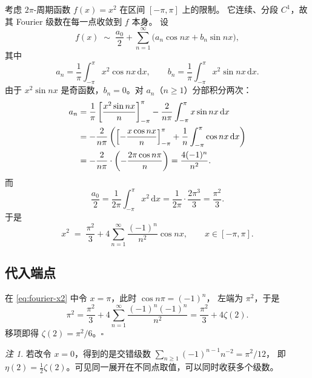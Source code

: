 \documentclass[11pt,a4paper]{ctexart}
\theoremstyle{definition}
\theoremstyle{remark}
\newtheorem*{remark}{注}
\newcommand{\dd}{\,\mathrm{d}}
\begin{document}
考虑 $2\pi$-周期函数 $f(x)=x^{2}$ 在区间 $[-\pi,\pi]$ 上的限制。
它连续、分段 $C^{1}$，故其 Fourier 级数在每一点收敛到 $f$ 本身。
设
\begin{equation}
  f(x) \;\sim\; \frac{a_{0}}{2}+\sum_{n=1}^{\infty}
  \bigl(a_{n}\cos nx + b_{n}\sin nx\bigr),
\end{equation}
其中
\begin{equation}
  a_{n}=\frac{1}{\pi}\int_{-\pi}^{\pi} x^{2}\cos nx\dd x,
  \qquad
  b_{n}=\frac{1}{\pi}\int_{-\pi}^{\pi} x^{2}\sin nx\dd x .
\end{equation}
由于 $x^{2}\sin nx$ 是奇函数，$b_{n}=0$。对 $a_{n}$（$n\ge 1$）分部积分两次：
\begin{align}
  a_{n}
  &=\frac{1}{\pi}\left[\frac{x^{2}\sin nx}{n}\right]_{-\pi}^{\pi}
    -\frac{2}{n\pi}\int_{-\pi}^{\pi} x\sin nx\dd x \notag\\
  &=-\frac{2}{n\pi}\left(\left[-\frac{x\cos nx}{n}\right]_{-\pi}^{\pi}
    +\frac{1}{n}\int_{-\pi}^{\pi}\cos nx\dd x\right) \notag\\
  &=-\frac{2}{n\pi}\cdot\left(-\frac{2\pi\cos n\pi}{n}\right)
    =\frac{4(-1)^{n}}{n^{2}} .
  \label{eq:an}
\end{align}
而
\begin{equation}
  \frac{a_{0}}{2}=\frac{1}{2\pi}\int_{-\pi}^{\pi}x^{2}\dd x
  =\frac{1}{2\pi}\cdot\frac{2\pi^{3}}{3}=\frac{\pi^{2}}{3}.
\end{equation}
于是
\begin{equation}
  x^{2} \;=\; \frac{\pi^{2}}{3}+4\sum_{n=1}^{\infty}
  \frac{(-1)^{n}}{n^{2}}\cos nx,
  \qquad x\in[-\pi,\pi].
  \label{eq:fourier-x2}
\end{equation}

\subsection{代入端点}

在 \eqref{eq:fourier-x2} 中令 $x=\pi$，此时 $\cos n\pi=(-1)^{n}$，
左端为 $\pi^{2}$，于是
\begin{equation}
  \pi^{2}=\frac{\pi^{2}}{3}+4\sum_{n=1}^{\infty}\frac{(-1)^{n}(-1)^{n}}{n^{2}}
  =\frac{\pi^{2}}{3}+4\zeta(2).
\end{equation}
移项即得 $\zeta(2)=\pi^{2}/6$。\hfill$\square$

\begin{remark}
若改令 $x=0$，得到的是交错级数 $\sum_{n\ge1}(-1)^{n-1}n^{-2}=\pi^{2}/12$，
即 $\eta(2)=\tfrac12\zeta(2)$。可见同一展开在不同点取值，可以同时收获多个级数。
\end{remark}
\end{document}
